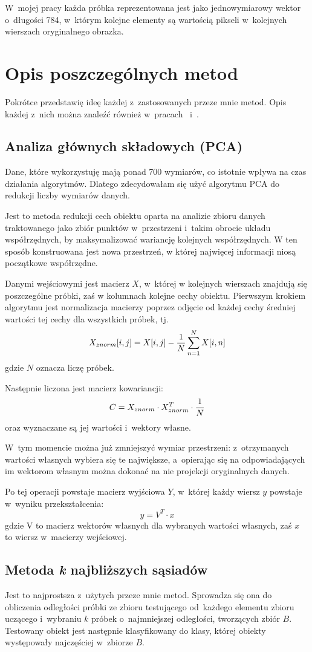 \documentclass[12pt]{article}
\begin{document}
W~mojej pracy każda próbka reprezentowana jest jako jednowymiarowy wektor o~długości 784, w~którym kolejne elementy są wartością pikseli w~kolejnych wierszach oryginalnego obrazka.

\section{Opis poszczególnych metod}
Pokrótce przedstawię ideę każdej z~zastosowanych przeze mnie metod. Opis każdej z~nich można znaleźć również w~pracach \cite{glowna praca}~i~\cite{bib:opis algorytmow}.
\subsection{Analiza głównych składowych (PCA)}
Dane, które wykorzystuję mają ponad 700 wymiarów, co istotnie wpływa na czas działania algorytmów. Dlatego zdecydowałam się użyć algorytmu PCA do redukcji liczby wymiarów danych.

Jest to metoda redukcji cech obiektu oparta na analizie zbioru danych traktowanego jako zbiór punktów w~przestrzeni i~takim obrocie układu współrzędnych, by maksymalizować wariancję kolejnych współrzędnych.
W ten sposób konstruowana jest nowa przestrzeń, w której najwięcej informacji niosą początkowe współrzędne.

Danymi wejściowymi jest macierz $X$, w~której w kolejnych wierszach znajdują się poszczególne próbki, zaś w kolumnach kolejne cechy obiektu. Pierwszym krokiem algorytmu jest normalizacja macierzy poprzez odjęcie od każdej cechy średniej
wartości tej cechy dla wszystkich próbek, tj.
\[
 X_{znorm}[i,j] = X[i,j] - {{1} \over {N}} \sum_{n=1}^N X[i,n]
\]
gdzie $N$ oznacza liczę próbek.

Następnie liczona jest macierz kowariancji:
\[
 C = {X_{znorm} \cdot X_{znorm}^T} \cdot {{1} \over {N}}
\]
oraz wyznaczane są jej wartości i~wektory własne.

W~tym momencie można już zmniejszyć wymiar przestrzeni: z~otrzymanych wartości własnych wybiera się te największe, a~opierając się na odpowiadających im wektorom własnym można dokonać na nie projekcji oryginalnych danych.

Po tej operacji powstaje macierz wyjściowa $Y$, w~której każdy wiersz $y$ powstaje w~wyniku przekształcenia:
\[
 y = V^T \cdot x
\]
gdzie V to macierz wektorów własnych dla wybranych wartości własnych, zaś $x$ to wiersz w~macierzy wejściowej.


\subsection{Metoda \emph{k} najbliższych sąsiadów}\label{chapter: knn}
Jest to najprostsza z~użytych przeze mnie metod. Sprowadza się ona do obliczenia odległości próbki ze zbioru testującego od~każdego elementu zbioru uczącego i~wybraniu $k$ próbek o~najmniejszej odległości, tworzących zbiór $B$. 
Testowany obiekt jest następnie klasyfikowany do klasy, której obiekty występowały najczęściej w~zbiorze $B$.
\end{document}
